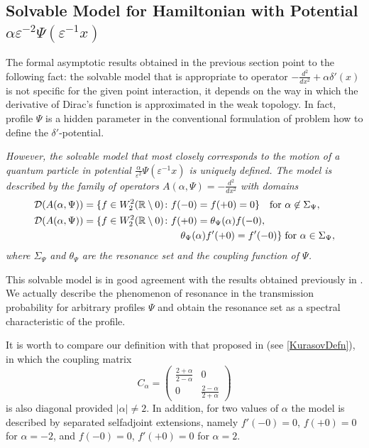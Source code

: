 \documentclass[11pt,english]{amsart}%
\begin{document}
\subsection{Solvable Model for Hamiltonian  with Potential
$\alpha \varepsilon^{-2}\Psi(\varepsilon^{-1}x)$}\label{SubsecWhatIsDeltaPrime}

The formal asymptotic results obtained in the previous section point to the following fact:
the solvable model that is appropriate to operator $-\frac{d^2}{dx^2}+\alpha\delta'(x)$
is not specific for the given point interaction, it depends on the way in which  the derivative of Dirac's function is approximated in the weak topology. In fact,  profile $\Psi$ is a hidden parameter in the conventional formulation of problem how to define the $\delta'$-potential.


\emph{However, the solvable model that most closely corresponds to the motion of a quantum particle in potential $\frac{\alpha}{\varepsilon^{2}}\Psi(\varepsilon^{-1}x)$ is uniquely defined. The model is described by the family of operators $A(\alpha,\Psi)=-\frac{d^2}{dx^2}$ with domains
\begin{align*}
    &\mathcal{D}(A(\alpha,\Psi))=\{f\in W_2^2(\mathbb R\setminus 0)\colon f(-0)=f(+0)=0\} \quad\text{for } \alpha\not\in \Sigma_\Psi,\\
    &\mathcal{D}(A(\alpha,\Psi))=\{f\in W_2^2(\mathbb R\setminus 0)\colon f(+0)
=\theta_\Psi (\alpha)f(-0),\\ &\hskip5.2cm \theta_\Psi (\alpha)f'(+0)=f'(-0)\} \;\text{for
} \alpha\in \Sigma_\Psi,
\end{align*}
where $\Sigma_\Psi$ and $\theta_\Psi$ are the resonance set and the coupling function of
$\Psi$.}

This solvable model is in good agreement with the results obtained previously in
\cite{ChristianZolotarIermak03,ToyamaNogami, Zolotaryuk06, Zolotaryuk08}.
We actually describe the phenomenon of resonance in the transmission probability for arbitrary profiles $\Psi$
and obtain the resonance set as a spectral characteristic of the profile.

It is worth to compare our definition with that proposed in \cite{KurElaMSI93, NizhFAA2006} (see  \eqref{KurasovDefn}), in which the coupling matrix
\begin{equation*}\label{MatrixKurasov}
C_\alpha=\begin{pmatrix}\frac{2+\alpha}{2-\alpha} & 0\\ 0 & \frac{2-\alpha}{2+\alpha} \end{pmatrix}
\end{equation*}
is also diagonal provided $|\alpha|\neq 2$. In addition, for two values of $\alpha$ the model is described by
separated selfadjoint extensions, namely   $f'(-0)=0$,  $f(+0)=0$ for $\alpha=-2$, and
$f(-0)=0$, $f'(+0)=0$ for $\alpha=2$.
\end{document}
